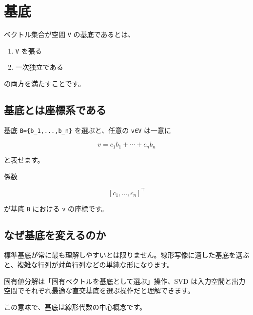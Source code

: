 \documentclass[
  11pt,
  a4paper,
]{ltjsarticle}
\author{}
\date{}
\providecommand{\tightlist}{%
  \setlength{\itemsep}{0pt}\setlength{\parskip}{0pt}}
\begin{document}
\hypertarget{ux57faux5e95}{%
\section{基底}\label{ux57faux5e95}}

ベクトル集合が空間 \texttt{V} の基底であるとは、

\begin{enumerate}
\def\labelenumi{\arabic{enumi}.}
\tightlist
\item
  \texttt{V} を張る
\item
  一次独立である
\end{enumerate}

の両方を満たすことです。

\hypertarget{ux57faux5e95ux3068ux306fux5ea7ux6a19ux7cfbux3067ux3042ux308b}{%
\subsection{基底とは座標系である}\label{ux57faux5e95ux3068ux306fux5ea7ux6a19ux7cfbux3067ux3042ux308b}}

基底 \texttt{B=\{b\_1,...,b\_n\}} を選ぶと、任意の \texttt{v∈V} は一意に

\[
v=c_1b_1+\cdots+c_nb_n
\]

と表せます。

係数

\[
[c_1,\dots,c_n]^\top
\]

が基底 \texttt{B} における \texttt{v} の座標です。

\hypertarget{ux306aux305cux57faux5e95ux3092ux5909ux3048ux308bux306eux304b}{%
\subsection{なぜ基底を変えるのか}\label{ux306aux305cux57faux5e95ux3092ux5909ux3048ux308bux306eux304b}}

標準基底が常に最も理解しやすいとは限りません。線形写像に適した基底を選ぶと、複雑な行列が対角行列などの単純な形になります。

固有値分解は「固有ベクトルを基底として選ぶ」操作、SVD
は入力空間と出力空間でそれぞれ最適な直交基底を選ぶ操作だと理解できます。

この意味で、基底は線形代数の中心概念です。
\end{document}
